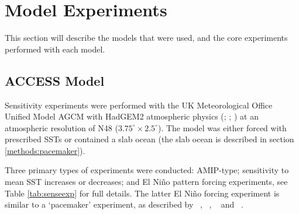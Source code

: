 \section{Model Experiments}

This section will describe the models that were used, and the core experiments 
performed with each model.


\subsection{ACCESS Model}

Sensitivity experiments were performed with the UK Meteorological Office Unified 
Model AGCM with HadGEM2 atmospheric physics (\citet{Davies2005}; 
\citet{Martin2010}; \citet{Bellouin2011}) at an atmospheric resolution of N48 
($3.75^{\circ} \times 2.5^{\circ}$). The model was either forced with prescribed 
SSTs or contained a slab ocean (the slab ocean is described in section 
\ref{methods:pacemaker}).

Three primary types of experiments were conducted: AMIP-type; sensitivity to 
mean SST increases or decreases; and El Ni{\~n}o pattern forcing experiments, 
see Table \ref{tab:senseexp} for full details. The latter El Ni{\~n}o forcing 
experiment is similar to a `pacemaker' experiment, as described by 
~\citealt{Alexander1992}, ~\citealt{Alexander1992a}, ~\citealt{Lau2000} and 
~\citealt{Lu2011}. 

